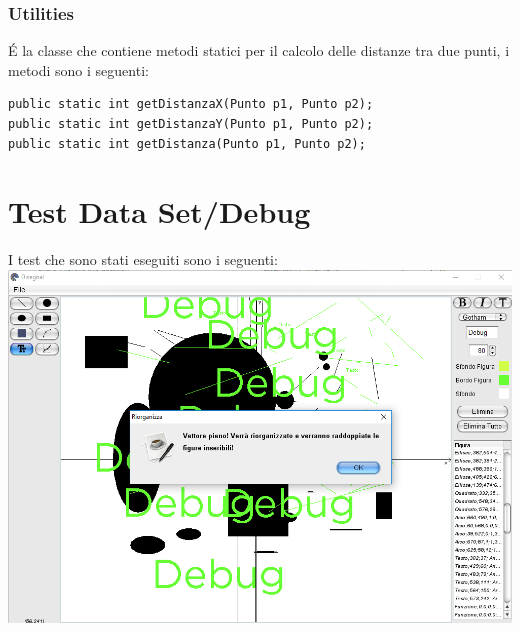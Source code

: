 \documentclass[a4paper,12pt]{article}
\begin{document}
\subsubsection{Utilities}
É la classe che contiene metodi statici per il calcolo delle distanze tra due punti, i metodi sono i seguenti:
\begin{lstlisting}
public static int getDistanzaX(Punto p1, Punto p2);
public static int getDistanzaY(Punto p1, Punto p2);
public static int getDistanza(Punto p1, Punto p2);
\end{lstlisting}

\section{Test Data Set/Debug}
I test che sono stati eseguiti sono i seguenti:\\
  \includegraphics[scale=.5]{Immagini/Debug/test1.png}
\end{document}
